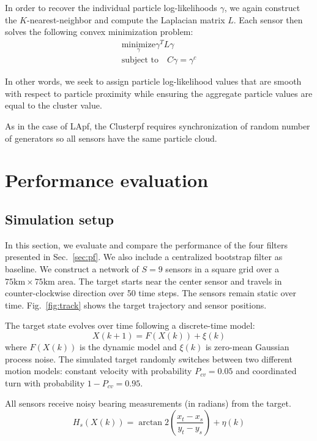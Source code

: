 \documentclass[10pt,letterpaper,final]{article}
\begin{document}
In order to recover the individual particle log-likelihoods $\gamma$, we again construct the $K$-nearest-neighbor and compute the Laplacian matrix $L$. Each sensor then solves the following convex minimization problem:
\begin{align*}
\underset{\gamma}{\text{minimize}} \gamma^TL\gamma  \\
\text{subject to} \quad C\gamma = \gamma^c
\end{align*}

In other words, we seek to assign particle log-likelihood values that are smooth with respect to particle proximity while ensuring the aggregate particle values are equal to the cluster value. 

As in the case of LApf, the Clusterpf requires synchronization of random number of generators so all sensors have the same particle cloud. 

\section{Performance evaluation}
\subsection{Simulation setup}
In this section, we evaluate and compare the performance of the four filters presented in Sec.~\ref{sec:pf}. We also include a centralized bootstrap filter as baseline. We construct a network of $S=9$ sensors in a square grid over a $75\text{km} \times 75\text{km}$ area. The target starts near the center sensor and travels in counter-clockwise direction over 50 time steps. The sensors remain static over time. Fig.~\ref{fig:track} shows the target trajectory and sensor positions. 

The target state evolves over time following a discrete-time model:
\begin{equation}
X(k+1) = F(X(k))+\xi(k)
\end{equation}
where $F(X(k))$ is the dynamic model and $\xi(k)$ is zero-mean Gaussian process noise. The simulated target randomly switches between two different motion models: constant velocity with probability $P_{cv} = 0.05$ and coordinated turn with probability $1-P_{cv}=0.95$. 

All sensors receive noisy bearing measurements (in radians) from the target.
\begin{equation}
H_s(X(k))= \arctan2 \left( \frac{x_t-x_s}{y_t-y_s} \right) + \eta(k)
\end{equation}
\end{document}
